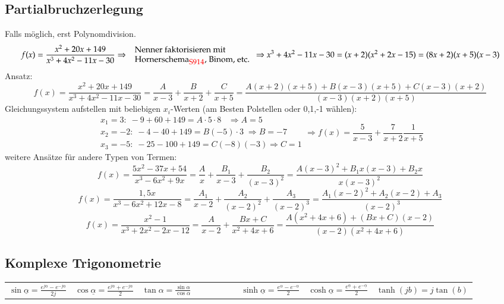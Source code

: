 	 \subsection{Partialbruchzerlegung}
		Falls möglich, erst Polynomdivision.
		\[f(x)=\frac{x^2+20x+149}{x^3+4x^2-11x-30} \Rightarrow \; \begin{array}{l}\text{Nenner faktorisieren mit}\\
		\text{Hornerschema$_{\textcolor{red}{\mbox{\small{S914}}}}$, Binom, etc.}\end{array} \Rightarrow x^{3}+4x^{2}-11x-30=(x+2)(x^{2}+2x-15)=(8x+2)(x+5)(x-3)\]
		Ansatz:
		\[f(x)=\frac{x^2+20x+149}{x^3+4x^2-11x-30}=\frac{A}{x-3} + \frac{B}{x+2} + \frac{C}{x+5}=
		\frac{A(x+2)(x+5)+B(x-3)(x+5)+C(x-3)(x+2)}{(x-3)(x+2)(x+5)}\]
		Gleichungssystem aufstellen mit beliebigen $x_i$-Werten (am Besten Polstellen oder 0,1,-1 wählen):
		\[\begin{array}{l}x_1=3:\;-9+60+149=A\cdot5\cdot8\;\;\;\Rightarrow A=5\\
		x_2=-2:\;-4-40+149=B(-5)\cdot3\; \Rightarrow B=-7\\
		x_3=-5:\;-25-100+149=C(-8)(-3) \Rightarrow C=1 \end{array} \Rightarrow f(x)=\frac{5}{x-3}+\frac{7}{x+2}\frac{1}{x+5}\]
		weitere Ansätze für andere Typen von Termen:
		\[f(x)=\frac{5x^2-37x+54}{x^3-6x^2+9x}=\frac{A}{x}+\frac{B_1}{x-3}+\frac{B_2}{(x-3)^2}=\frac{A(x-3)^2+B_1x(x-3)+B_2x}{x(x-3)^2}\]
		\[f(x)=\frac{1,5x}{x^3-6x^2+12x-8}=\frac{A_1}{x-2}+\frac{A_2}{(x-2)^2}+\frac{A_3}{(x-2)^3}=\frac{A_1(x-2)^2+A_2(x-2)+A_3}{(x-2)^3}\]
		\[f(x)=\frac{x^2-1}{x^3+2x^2-2x-12}=\frac{A}{x-2}+\frac{Bx+C}{x^2+4x+6}=\frac{A(x^2+4x+6)+(Bx+C)(x-2)}{(x-2)(x^2+4x+6)}\]
	\subsection {Komplexe Trigonometrie}
\begin{tabular}{lllllll}
$\sin{\underline{\alpha}} = \frac{e^{j\underline{\alpha}} - e^{-j\underline{\alpha}}}{2j}$ &

$\cos{\underline{\alpha}} = \frac{e^{j\underline{\alpha}} + e^{-j\underline{\alpha}}}{2}$ &

$\tan{\alpha} = \frac{\sin \alpha}{\cos \alpha}$ & 

$ \qquad \qquad $ &

$\sinh{\underline{\alpha}} = \frac{e^{\underline{\alpha}} - e^{-\underline{\alpha}}}{2} $ &

$\cosh{\underline{\alpha}} = \frac{e^{\underline{\alpha}} + e^{-\underline{\alpha}}}{2} $ &

		$\tanh(jb)=j \tan(b)$ 
\end{tabular}
							
	 